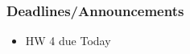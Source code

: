 \begin{frame}
    \frametitle{Deadlines/Announcements}
\begin{itemize}
            \item HW 4 due Today
        \end{itemize}
\end{frame}